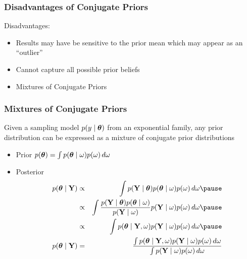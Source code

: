 \documentclass[handout]{beamer}\usepackage[]{graphicx}\usepackage[]{color}
\begin{document}
\begin{frame}
  \frametitle{Disadvantages of Conjugate Priors}
  Disadvantages: \pause
\begin{itemize}
\item Results  may have be sensitive to the  prior mean which may appear as an ``outlier''  \pause
\vspace{1.5in}

\item Cannot capture all possible prior beliefs \pause
\item Mixtures of Conjugate Priors
\end{itemize}
\end{frame}

\begin{frame} \frametitle{Mixtures of Conjugate Priors}
  \begin{theorem}  Given a sampling model
  $p(y \mid \boldsymbol{\theta})$ from an exponential family, any prior distribution
  can be expressed as a mixture of conjugate prior distributions
 \end{theorem}

 \begin{itemize}
 \item Prior $p(\boldsymbol{\theta}) = \int p(\boldsymbol{\theta} \mid \omega) p(\omega)\, d \omega$ \pause
 \item Posterior \pause
   \begin{eqnarray*}
   p(\t \mid \Y)  &\propto & \int p(\Y \mid \t) p(\t \mid \omega)
   p(\omega) \, d\omega \pause \\
 & \propto & \int  \frac{  p(\Y \mid \t) p(\t \mid \omega) } {p(\Y \mid
   \omega)}  p(\Y \mid
 \omega) p(\omega ) \, d \omega  \pause \\
& \propto & \int p(\t \mid \Y, \omega)  p(\Y \mid
 \omega) p(\omega ) \, d \omega \pause \\
 p(\t \mid \Y) & =  & \frac{\int p(\t \mid \Y, \omega)  p(\Y \mid
 \omega) p(\omega ) \, d \omega }
{\int p(\Y \mid
 \omega) p(\omega ) \, d \omega }
       \end{eqnarray*}

 \end{itemize}
\end{frame}
\end{document}
